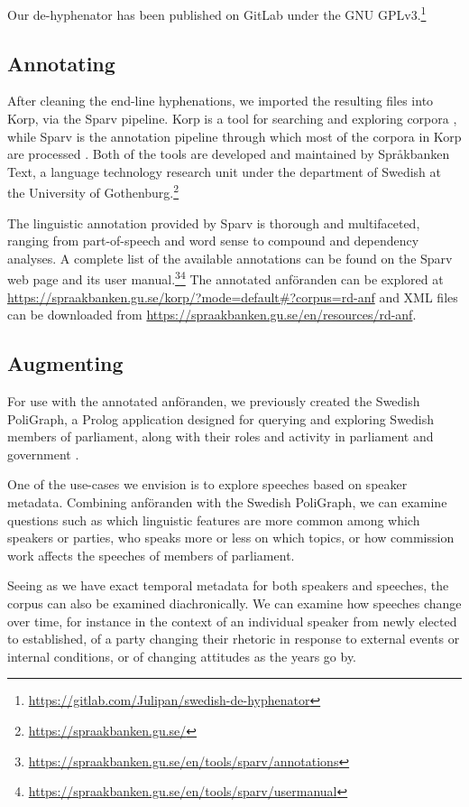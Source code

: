 Our de-hyphenator has been published on GitLab under the GNU GPLv3.\footnote{\url{https://gitlab.com/Julipan/swedish-de-hyphenator}}

\subsection{Annotating}

After cleaning the end-line hyphenations, we imported the resulting files into Korp, via the Sparv pipeline. Korp is a tool for searching and exploring corpora \cite{borin_korp_2012}, while Sparv is the annotation pipeline through which most of the corpora in Korp are processed \cite{borin_sparv_2016}. Both of the tools are developed and maintained by Språkbanken Text, a language technology research unit under the department of Swedish at the University of Gothenburg.\footnote{\url{https://spraakbanken.gu.se/}}

The linguistic annotation provided by Sparv is thorough and multifaceted, ranging from part-of-speech and word sense to compound and dependency analyses. A complete list of the available annotations can be found on the Sparv web page and its user manual.\footnote{\url{https://spraakbanken.gu.se/en/tools/sparv/annotations}}\footnote{\url{https://spraakbanken.gu.se/en/tools/sparv/usermanual}} The annotated anföranden can be explored at \url{https://spraakbanken.gu.se/korp/?mode=default#?corpus=rd-anf} and XML files can be downloaded from \url{https://spraakbanken.gu.se/en/resources/rd-anf}.

\subsection{Augmenting}

For use with the annotated anföranden, we previously created the Swedish PoliGraph, a Prolog application designed for querying and exploring Swedish members of parliament, along with their roles and activity in parliament and government \parencite{rodven-eide_swedish_2019}.

One of the use-cases we envision is to explore speeches based on speaker metadata. Combining anföranden with the Swedish PoliGraph, we can examine questions such as which linguistic features are more common among which speakers or parties, who speaks more or less on which topics, or how commission work affects the speeches of members of parliament.

Seeing as we have exact temporal metadata for both speakers and speeches, the corpus can also be examined diachronically. We can examine how speeches change over time, for instance in the context of an individual speaker from newly elected to established, of a party changing their rhetoric in response to external events or internal conditions, or of changing attitudes as the years go by.

